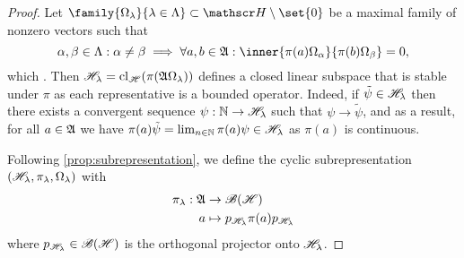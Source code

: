 \begin{proof}
    Let \(\family{\Omega_{\lambda}}{\lambda \in \Lambda} \subset \hilbert \setminus \set{0}\) be a maximal family of nonzero vectors such that
    \begin{equation*}
        \alpha, \beta \in \Lambda : \alpha \neq \beta \implies \forall a, b \in \algebra{A} : \inner{\pi(a)\Omega_{\alpha}}{\pi(b)\Omega_{\beta}} = 0,
    \end{equation*}
    which . Then \(\mathscr{H}_{\lambda} = \operatorname{cl}_{\mathscr{H}}(\pi(\mathfrak{A}\Omega_{\lambda}))\) defines a closed linear subspace that is stable under \(\pi\) as each representative is a bounded operator. Indeed, if \(\tilde{\psi} \in \mathscr{H}_{\lambda}\) then there exists a convergent sequence \(\psi : \mathbb{N} \to \mathscr{H}_{\lambda}\) such that \(\psi \to \tilde{\psi}\), and as a result, for all \(a \in \mathfrak{A}\) we have \(\pi(a)\tilde{\psi} = \lim_{n\in \mathbb{N}}{\pi(a)\psi} \in \mathscr{H}_{\lambda}\) as \(\pi(a)\) is continuous.

    Following \cref{prop:subrepresentation}, we define the cyclic subrepresentation \((\mathscr{H}_{\lambda}, \pi_{\lambda}, \Omega_{\lambda})\) with
    \begin{align*}
        \pi_{\lambda} : \mathfrak{A} &\to \mathscr{B}(\mathscr{H})\\
                                  a &\mapsto p_{\mathscr{H}_{\lambda}}\pi(a)p_{\mathscr{H}_{\lambda}}
    \end{align*}
    where \(p_{\mathscr{H}_{\lambda}} \in \mathscr{B}(\mathscr{H})\) is the orthogonal projector onto \(\mathscr{H}_{\lambda}\). 
\end{proof}
